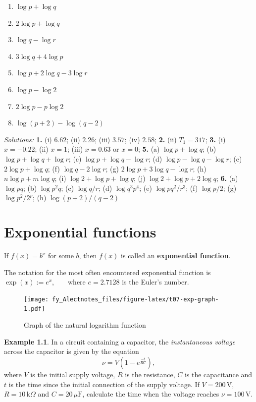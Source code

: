 \documentclass[
  12pt,
  oneside]{book}
\providecommand{\tightlist}{%
  \setlength{\itemsep}{0pt}\setlength{\parskip}{0pt}}
\theoremstyle{definition}
\theoremstyle{definition}
\newtheorem{example}{Example}[chapter]
\theoremstyle{definition}
\theoremstyle{definition}
\theoremstyle{remark}
\begin{document}
\begin{enumerate}
  \begin{enumerate}
  \def\labelenumii{\alph{enumii})}
  \tightlist
  \item
    \(\log p+\log q\)
  \item
    \(2\log p+\log q\)
  \item
    \(\log q-\log r\)
  \item
    \(3\log q+4\log p\)
  \item
    \(\log p+2\log q-3\log r\)
  \item
    \(\log p-\log 2\)
  \item
    \(2\log p-p\log 2\)
  \item
    \(\log(p+2)-\log(q-2)\)
  \end{enumerate}
\end{enumerate}

\emph{Solutions:}
\textbf{1.} (i) \(6.62\); (ii) \(2.26\); (iii) \(3.57\); (iv) \(2.58\);
\textbf{2.} (ii) \(T_1=317\);
\textbf{3.} (i) \(x=-0.22\); (ii) \(x=1\); (iii) \(x=0.63\) or \(x=0\);
\textbf{5.} (a) \(\log p+\log q\); (b) \(\log p+\log q+\log r\); (c) \(\log p+\log q-\log r\); (d) \(\log p-\log q-\log r\); (e) \(2\log p+\log q\); (f) \(\log q-2\log r\); (g) \(2\log p+3\log q-\log r\); (h) \(n\log p+m\log q\); (i) \(\log 2+\log p+\log q\); (j) \(\log 2+\log p+2\log q\);
\textbf{6.} (a) \(\log pq\); (b) \(\log p^2q\); (c) \(\log q/r\); (d) \(\log q^3p^4\); (e) \(\log pq^2/r^3\); (f) \(\log p/2\); (g) \(\log p^2/2^p\); (h) \(\log (p+2)/(q-2)\)

\hypertarget{exponential-functions}{%
\chapter{Exponential functions}\label{exponential-functions}}

If \(f(x)=b^x\) for some \(b\), then \(f(x)\) is called an \textbf{exponential function}.

The notation for the most often encountered exponential function is \(\exp(x):= e^x\), ~ ~ where \(e=2.7128\) is the Euler's number.

\begin{figure}
\centering
\texttt{[image: fy\_Alectnotes\_files/figure-latex/t07-exp-graph-1.pdf]}
\caption{\label{fig:t07-exp-graph}Graph of the natural logarithm function}
\end{figure}

\begin{example}
In a circuit containing a capacitor, the \emph{instantaneous voltage} across the capacitor is given by the equation
\[\nu = V\left(1-e^{\frac{-t}{RC}}\right),\]
where \(V\) is the initial supply voltage, \(R\) is the resistance, \(C\) is the capacitance and \(t\) is the time since the initial connection of the supply voltage. If \(V=200\,\mathrm{V}\), \(R=10\,\mathrm{k}\Omega\) and \(C=20\,\mu\mathrm{F}\), calculate the time when the voltage reaches \(\nu =100\,\mathrm{V}\).
\end{example}
\end{document}
